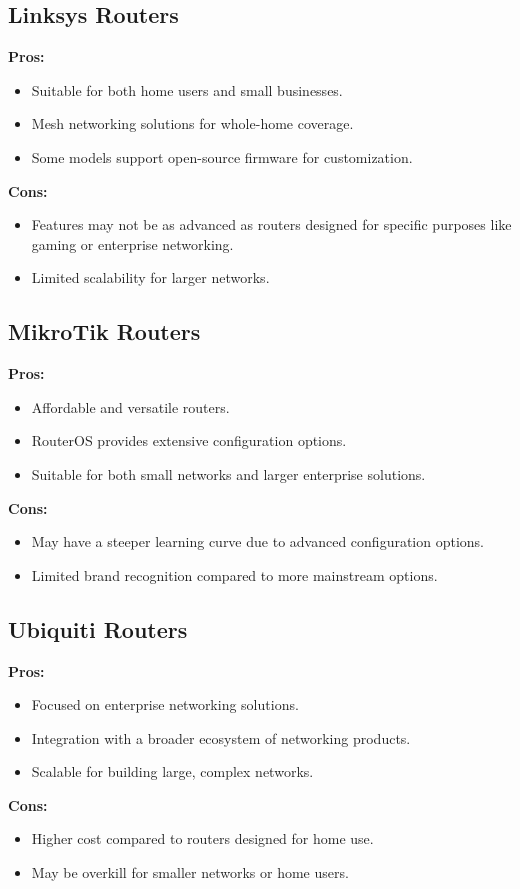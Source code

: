 \documentclass[11pt]{article}
\begin{document}
\subsection{Linksys Routers}
\textbf{Pros:}
\begin{itemize}
  \item Suitable for both home users and small businesses.
  \item Mesh networking solutions for whole-home coverage.
  \item Some models support open-source firmware for customization.
\end{itemize}
\textbf{Cons:}
\begin{itemize}
  \item Features may not be as advanced as routers designed for specific purposes like
        gaming or enterprise networking.
  \item Limited scalability for larger networks.
\end{itemize}

\subsection{MikroTik Routers}
\textbf{Pros:}
\begin{itemize}
  \item Affordable and versatile routers.
  \item RouterOS provides extensive configuration options.
  \item Suitable for both small networks and larger enterprise solutions.
\end{itemize}
\textbf{Cons:}
\begin{itemize}
  \item May have a steeper learning curve due to advanced configuration options.
  \item Limited brand recognition compared to more mainstream options.
\end{itemize}

\subsection{Ubiquiti Routers}
\textbf{Pros:}
\begin{itemize}
  \item Focused on enterprise networking solutions.
  \item Integration with a broader ecosystem of networking products.
  \item Scalable for building large, complex networks.
\end{itemize}
\textbf{Cons:}
\begin{itemize}
  \item Higher cost compared to routers designed for home use.
  \item May be overkill for smaller networks or home users.
\end{itemize}
\end{document}

